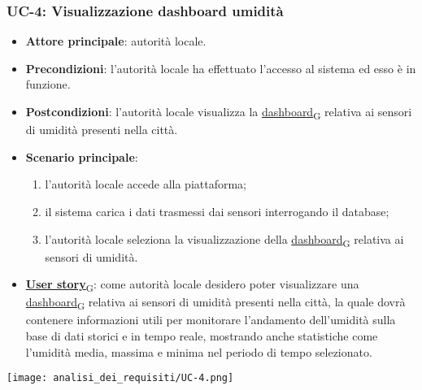 \subsubsection{UC-4: Visualizzazione dashboard umidità}
\begin{itemize}
	\item \textbf{Attore principale}: autorità locale.
	\item \textbf{Precondizioni}: l'autorità locale ha effettuato l'accesso al sistema ed esso è in funzione.
	\item \textbf{Postcondizioni}: l'autorità locale visualizza la \href{https://7last.github.io/docs/pb/documentazione-interna/glossario\#dashboard}{dashboard\textsubscript{G}} relativa
	      ai sensori di umidità presenti nella città.
	\item \textbf{Scenario principale}:
	      \begin{enumerate}
		      \item l'autorità locale accede alla piattaforma;
		      \item il sistema carica i dati trasmessi dai sensori interrogando il database;
		      \item l'autorità locale seleziona la visualizzazione della \href{https://7last.github.io/docs/pb/documentazione-interna/glossario\#dashboard}{dashboard\textsubscript{G}} relativa ai sensori di umidità.
	      \end{enumerate}
	\item \href{https://7last.github.io/docs/pb/documentazione-interna/glossario\#user-story}{\textbf{User story}\textsubscript{G}}:
	      come autorità locale desidero poter visualizzare una \href{https://7last.github.io/docs/pb/documentazione-interna/glossario\#dashboard}{dashboard\textsubscript{G}} relativa ai sensori di umidità presenti nella città, la quale
	      dovrà contenere informazioni utili per monitorare l'andamento dell'umidità sulla base di dati storici e in tempo reale, mostrando
	      anche statistiche come l'umidità media, massima e minima nel periodo di tempo selezionato.
\end{itemize}
\begin{center}
	\texttt{[image: analisi\_dei\_requisiti/UC-4.png]}
\end{center}


